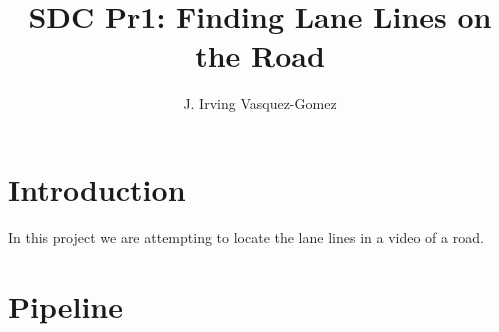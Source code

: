\documentclass[]{article}
\title{SDC Pr1: Finding Lane Lines on the Road}
\author{J. Irving Vasquez-Gomez}
\begin{document}
\maketitle

\begin{abstract}

\end{abstract}

\section{Introduction}

In this project we are attempting to locate the lane lines in a video of a road.

\section{Pipeline}
\end{document}
